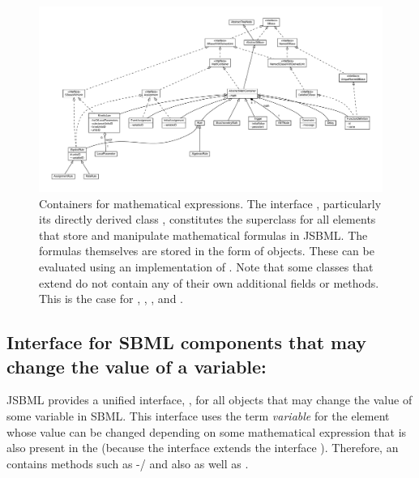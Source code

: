 \begin{figure}
 \centering
 \includegraphics[width=\textwidth]{../common/img/MathContainer.pdf}
 \caption[Containers for mathematical expressions]{Containers for
   mathematical expressions. The interface \MathContainer, particularly its
   directly derived class \AbstractMathContainer, constitutes the
   superclass for all elements that store and manipulate mathematical
   formulas in JSBML.  The formulas themselves are stored in the form of
   \ASTNode objects. These can be evaluated using an implementation of
   \ASTNodeCompiler. Note that some classes that extend
   \AbstractMathContainer do not contain any of their own additional fields
   or methods.  This is the case for \Delay, \Priority, \StoichiometryMath,
   and \AlgebraicRule.}
 \label{fig:MathContainerHierarchy}
\end{figure}


\subsection{Interface for SBML components that may change the value of
  a variable: }
\label{sec:assignment-interface}

JSBML provides a unified interface, \Assignment, for all objects that may
change the value of some variable in SBML.  This interface uses
the term \emph{variable} for the element whose value can be changed
depending on some mathematical expression that is also present in the
\Assignment (because the interface \Assignment extends the interface
\MathContainer).  Therefore, an  contains methods such as
-/ and also 
as well as .

